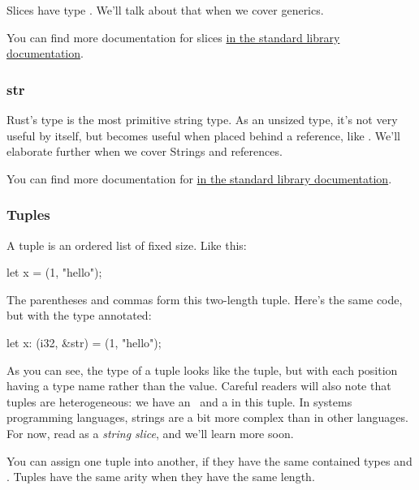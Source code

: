 Slices have type \code{\&[T]}. We'll talk about that  when we cover generics.

\blank

You can find more documentation for slices \href{https://doc.rust-lang.org/std/primitive.slice.html}{in the standard library documentation}.

\subsubsection*{str}

Rust's  type is the most primitive string type. As an unsized type, it's not very useful by itself, but becomes useful 
when placed behind a reference, like . We'll elaborate further when we cover Strings and references.

\blank

You can find more documentation for  \href{https://doc.rust-lang.org/std/primitive.str.html}{in the standard library
documentation}.

\subsubsection*{Tuples}

A tuple is an ordered list of fixed size. Like this:

\begin{rustc}
let x = (1, "hello");
\end{rustc}

The parentheses and commas form this two-length tuple. Here's the same code, but with the type annotated:

\begin{rustc}
let x: (i32, &str) = (1, "hello");
\end{rustc}

As you can see, the type of a tuple looks like the tuple, but with each position having a type name rather than the value. Careful 
readers will also note that tuples are heterogeneous: we have an \itt\ and a  in this tuple. In systems programming
languages, strings are a bit more complex than in other languages. For now, read  as a \emph{string slice}, and we'll 
learn more soon.

\blank

You can assign one tuple into another, if they have the same contained types and . Tuples have the same arity 
when they have the same length.

